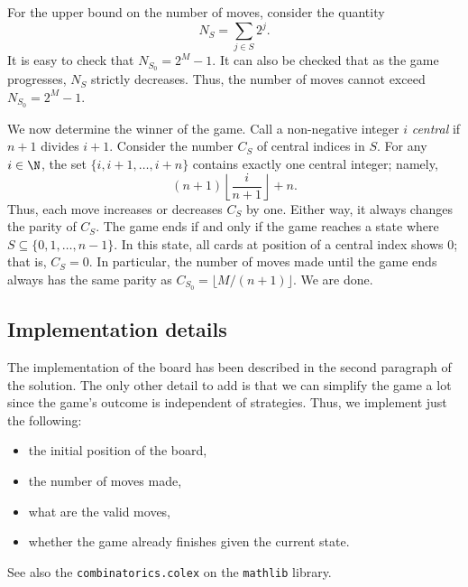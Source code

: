 For the upper bound on the number of moves, consider the quantity
\[ N_S = \sum_{j \in S} 2^j. \]
It is easy to check that $N_{S_0} = 2^M - 1$.
It can also be checked that as the game progresses, $N_S$ strictly decreases.
Thus, the number of moves cannot exceed $N_{S_0} = 2^M - 1$.

We now determine the winner of the game.
Call a non-negative integer $i$ \emph{central} if $n + 1$ divides $i + 1$.
Consider the number $C_S$ of central indices in $S$.
For any $i \in \N$, the set $\{i, i + 1, \ldots, i + n\}$ contains exactly one central integer; namely,
\[ (n + 1) \left\lfloor \frac{i}{n + 1} \right\rfloor + n. \]
Thus, each move increases or decreases $C_S$ by one.
Either way, it always changes the parity of $C_S$.
The game ends if and only if the game reaches a state where $S \subseteq \{0, 1, \ldots, n - 1\}$.
In this state, all cards at position of a central index shows $0$; that is, $C_S = 0$.
In particular, the number of moves made until the game ends always has the same parity as $C_{S_0} = \lfloor M/(n + 1) \rfloor$.
We are done.



\subsection*{Implementation details}

The implementation of the board has been described in the second paragraph of the solution.
The only other detail to add is that we can simplify the game a lot since the game's outcome is independent of strategies.
Thus, we implement just the following:
\begin{itemize}
    \item   the initial position of the board,
    \item   the number of moves made,
    \item   what are the valid moves,
    \item   whether the game already finishes given the current state.
\end{itemize}

See also the \texttt{combinatorics.colex} on the \texttt{mathlib} library.
